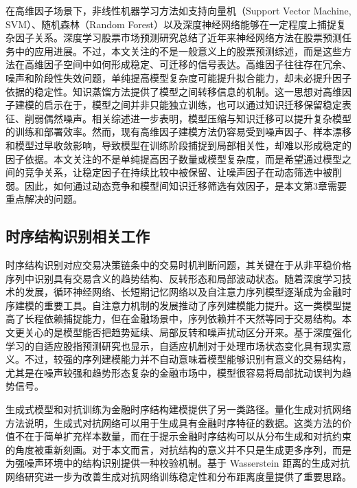 在高维因子场景下，非线性机器学习方法如支持向量机（Support Vector Machine, SVM）、随机森林（Random Forest）以及深度神经网络能够在一定程度上捕捉复杂因子关系。深度学习股票市场预测研究总结了近年来神经网络方法在股票预测任务中的应用进展\cite{jiang2021applications}。不过，本文关注的不是一般意义上的股票预测综述，而是这些方法在高维因子空间中如何形成稳定、可迁移的信号表达。高维因子往往存在冗余、噪声和阶段性失效问题，单纯提高模型复杂度可能提升拟合能力，却未必提升因子依据的稳定性。知识蒸馏方法提供了模型之间转移信息的机制\cite{hinton2015distilling}。这一思想对高维因子建模的启示在于，模型之间并非只能独立训练，也可以通过知识迁移保留稳定表征、削弱偶然噪声。相关综述进一步表明，模型压缩与知识迁移可以提升复杂模型的训练和部署效率\cite{gou2021knowledge}。然而，现有高维因子建模方法仍容易受到噪声因子、样本漂移和模型过早收敛影响，导致模型在训练阶段捕捉到局部相关性，却难以形成稳定的因子依据。本文关注的不是单纯提高因子数量或模型复杂度，而是希望通过模型之间的竞争关系，让稳定因子在持续比较中被保留、让噪声因子在动态筛选中被削弱。因此，如何通过动态竞争和模型间知识迁移筛选有效因子，是本文第3章需要重点解决的问题。

\subsection{时序结构识别相关工作}
时序结构识别对应交易决策链条中的交易时机判断问题，其关键在于从非平稳价格序列中识别具有交易含义的趋势结构、反转形态和局部波动状态。随着深度学习技术的发展，循环神经网络、长短期记忆网络以及自注意力序列模型逐渐成为金融时序建模的重要工具。自注意力机制的发展推动了序列建模能力提升\cite{vaswani2017attention}。这一类模型提高了长程依赖捕捉能力，但在金融场景中，序列依赖并不天然等同于交易结构。本文更关心的是模型能否把趋势延续、局部反转和噪声扰动区分开来。基于深度强化学习的自适应股指预测研究也显示，自适应机制对于处理市场状态变化具有现实意义\cite{bu2023adaptive}。不过，较强的序列建模能力并不自动意味着模型能够识别有意义的交易结构，尤其是在噪声较强和趋势形态复杂的金融市场中，模型很容易将局部扰动误判为趋势信号。

生成式模型和对抗训练为金融时序结构建模提供了另一类路径。量化生成对抗网络方法说明，生成式对抗网络可以用于生成具有金融时序特征的数据\cite{wiese2020quant}。这类方法的价值不在于简单扩充样本数量，而在于提示金融时序结构可以从分布生成和对抗约束的角度被重新刻画。对于本文而言，对抗结构的意义并不只是生成更多序列，而是为强噪声环境中的结构识别提供一种校验机制。基于 Wasserstein 距离的生成对抗网络研究进一步为改善生成对抗网络训练稳定性和分布距离度量提供了重要思路\cite{arjovsky2017wasserstein}。

